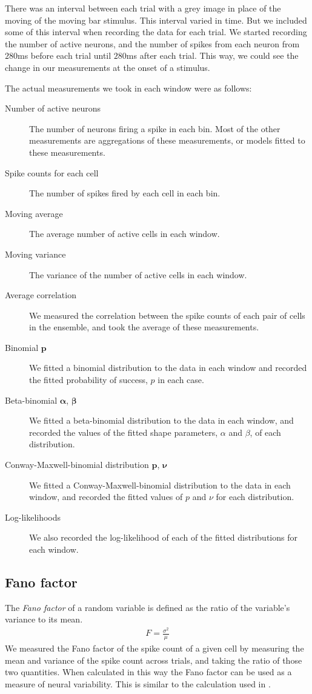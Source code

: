 \documentclass[a4paper,12pt]{article}
\theoremstyle{definition}
\begin{document}
    There was an interval between each trial with a grey image in place of the moving of the moving bar stimulus. This interval varied in time. But we included some of this interval when recording the data for each trial. We started recording the number of active neurons, and the number of spikes from each neuron from $280$ms before each trial until $280$ms after each trial. This way, we could see the change in our measurements at the onset of a stimulus.

    The actual measurements we took in each window were as follows:
    \begin{description}
      \item[Number of active neurons] The number of neurons firing a spike in each bin. Most of the other measurements are aggregations of these measurements, or models fitted to these measurements.
      \item[Spike counts for each cell] The number of spikes fired by each cell in each bin.
      \item[Moving average] The average number of active cells in each window.
      \item[Moving variance] The variance of the number of active cells in each window.
      \item[Average correlation] We measured the correlation between the spike counts of each pair of cells in the ensemble, and took the average of these measurements.
      \item[Binomial $\mathbf{p}$] We fitted a binomial distribution to the data in each window and recorded the fitted probability of success, $p$ in each case.
      \item[Beta-binomial $\boldsymbol{\alpha}$, $\boldsymbol{\beta}$] We fitted a beta-binomial distribution to the data in each window, and recorded the values of the fitted shape parameters, $\alpha$ and $\beta$, of each distribution.
      \item[Conway-Maxwell-binomial distribution $\mathbf{p}$, $\boldsymbol{\nu}$] We fitted a Conway-Maxwell-binomial distribution to the data in each window, and recorded the fitted values of $p$ and $\nu$ for each distribution.
      \item[Log-likelihoods] We also recorded the log-likelihood of each of the fitted distributions for each window.
    \end{description}

    \subsection{Fano factor}\label{sec:faco_factor}
    The \textit{Fano factor} of a random variable is defined as the ratio of the variable's variance to its mean.
    \begin{align}\label{eq:fano_factor}
      F = \frac{\sigma^2}{\mu}
    \end{align}
    We measured the Fano factor of the spike count of a given cell by measuring the mean and variance of the spike count across trials, and taking the ratio of those two quantities. When calculated in this way the Fano factor can be used as a measure of neural variability.  This is similar to the calculation used in \cite{churchland}.
\end{document}
